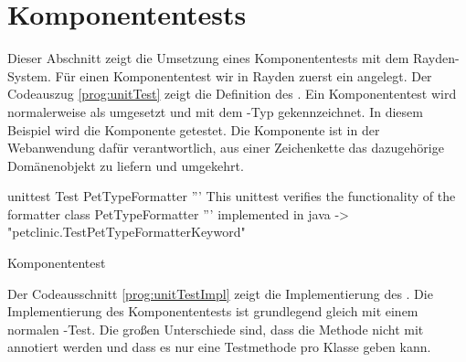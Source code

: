 \section{Komponententests}
\label{cha:TestenUnit}

Dieser Abschnitt zeigt die Umsetzung eines Komponententests mit dem Rayden-System. Für einen Komponententest wir in Rayden zuerst ein  angelegt. Der Codeauszug \ref{prog:unitTest} zeigt die Definition des . Ein Komponententest wird normalerweise als  umgesetzt und mit dem -Typ  gekennzeichnet. In diesem Beispiel wird die Komponente  getestet. Die Komponente ist in der Webanwendung dafür verantwortlich, aus einer Zeichenkette das dazugehörige Domänenobjekt zu liefern und umgekehrt. 

\begin{program}
\begin{JavaCode}
unittest Test PetTypeFormatter {
	''' This unittest verifies the functionality of the 
	    formatter class PetTypeFormatter '''
	implemented in java -> "petclinic.TestPetTypeFormatterKeyword"
}
\end{JavaCode}
\caption{Komponententest }
\label{prog:unitTest}
\end{program}

\SuperPar
Der Codeausschnitt \ref{prog:unitTestImpl} zeigt die Implementierung des . Die Implementierung des Komponententests ist grundlegend gleich mit einem normalen -Test. Die großen Unterschiede sind, dass die Methode nicht mit  annotiert werden und dass es nur eine Testmethode pro Klasse geben kann. 

